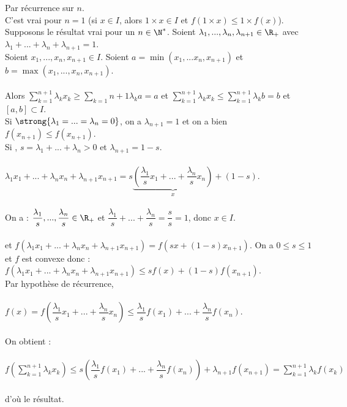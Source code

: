 \documentclass[12pt,a4paper]{report}
\begin{document}
\begin{demo}
Par récurrence sur $n$. \\
C'est vrai pour $n =1$ (si $x \in I$, alors $1\times x \in I$ et $f(1\times x) \le 1\times f(x)$). \\
Supposons le résultat vrai pour un $n \in \N^*$. Soient $\lambda_1,...,\lambda_n,\lambda_{n+1} \in \R_+$ avec $\lambda_1+...+\lambda_n+\lambda_{n+1}=1$. \\
Soient $x_1,...,x_n,x_{n+1} \in I$. Soient $a = \min (x_1,...x_n,x_{n+1})$ et $b = \max(x_1,...,x_n,x_{n+1})$. \\ \\
Alors $\displaystyle{\sum_{k=1}^{n+1} \lambda_kx_k \ge \sum_{k=1}{n+1}\lambda_ka = a}$ et $\displaystyle{\sum_{k=1}^{n+1}\lambda_kx_k \le \sum_{k=1}^{n+1}\lambda_kb = b}$ et $[a,b] \subset I$. \\
Si $\strong{\lambda_1=...=\lambda_n = 0}$, on a $\lambda_{n+1}=1$ et on a bien $f(x_{n+1}) \le f(x_{n+1})$. \\
Si , $s=\lambda_1+...+\lambda_n>0$ et $\lambda_{n+1}=1-s$. \\ \\
$\lambda_1x_1 + ... + \lambda_nx_n + \lambda_{n+1}x_{n+1} = s\underbrace{\left(\dfrac{\lambda_1}{s}x_1 + ... + \dfrac{\lambda_n}{s}x_n\right)}_{x} + (1-s)$. \\ \\
On a : $\dfrac{\lambda_1}{s},...,\dfrac{\lambda_n}{s} \in \R_+$ et $\dfrac{\lambda_1}{s} + ... + \dfrac{\lambda_n}{s} = \dfrac{s}{s} = 1$, donc $x \in I$. \\ \\
et $f(\lambda_1x_1+...+\lambda_nx_n + \lambda_{n+1}x_{n+1}) = f(sx + (1-s)x_{n+1})$. On a $0 \le s \le 1$ et $f$ est convexe donc : \\
$f(\lambda_1x_1+...+\lambda_nx_n + \lambda_{n+1}x_{n+1}) \le sf(x) + (1-s)f(x_{n+1})$. \\
Par hypothèse de récurrence,  \\ \\
$f(x) = f\left(\dfrac{\lambda_1}{s}x_1 + ... + \dfrac{\lambda_n}{s}x_n\right) \le \dfrac{\lambda_1}{s}f(x_1) + ... + \dfrac{\lambda_n}{s}f(x_n)$. \\ \\
On obtient : \\ \\
$f\left(\displaystyle{\sum_{k=1}^{n+1}\lambda_kx_k}\right) \le s \left(\dfrac{\lambda_1}{s}f(x_1) + ... + \dfrac{\lambda_n}{s}f(x_n)\right) + \lambda_{n+1}f(x_{n+1}) = \displaystyle{\sum_{k=1}^{n+1}\lambda_kf(x_k)}$ \\ \\
d'où le résultat.
\end{demo}
\end{document}
